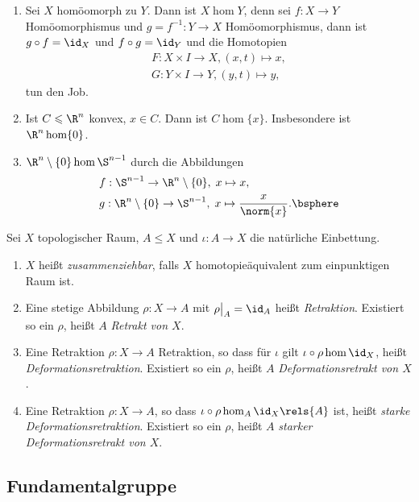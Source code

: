 \begin{bsp}
\label{bsp:3.1.9}
\begin{enumerate}
  \item Sei $X$ homöomorph zu $Y$. Dann ist $X\hom Y$, denn sei $f: X\to Y$
  Homöomorphismus und $g=f^{-1} : Y\to X$ Homöomorphismus, dann ist $g\circ f =
  \id_X$ und $f\circ g = \id_Y$ und die Homotopien
  \begin{align*}
  F: X\times I \to X, (x,t)\mapsto x,\\
  G: Y\times I\to Y, (y,t)\mapsto y,
  \end{align*}
tun den Job.
\item Ist $C\leqslant \R^n$ konvex, $x\in C$. Dann ist $C\hom\{x\}$.
Insbesondere ist $\R^n\hom \{0\}$.
\item $\R^n\setminus\{0\}\hom \S^{n-1}$ durch die Abbildungen
\begin{align*}
&f: \S^{n-1}\to \R^n\setminus\{0\},\; x\mapsto x,\\
&g: \R^n\setminus\{0\} \to \S^{n-1},\; x\mapsto \frac{x}{\norm{x}}.\bsphere
\end{align*}
\end{enumerate}
\end{bsp}

\begin{defn}
\label{defn:3.1.10}
Sei $X$ topologischer Raum, $A\leqslant X$ und $\iota: A\to X$ die natürliche
Einbettung.
\begin{enumerate}[label=(\roman{*})]
  \item $X$ heißt \emph{zusammenziehbar}, falls $X$ homotopieäquivalent zum
  einpunktigen Raum ist.
  \item Eine stetige Abbildung $\rho: X\to A$ mit $\rho\big|_{A} = \id_A$ heißt
  \emph{Retraktion}. Existiert so ein $\rho$, heißt $A$
  \emph{Retrakt von $X$}.
  \item Eine Retraktion $\rho: X\to A$ Retraktion, so dass für 
  $\iota$ gilt $\iota\circ\rho \hom \id_X$, heißt 
  \emph{Deformationsretraktion}. Existiert so ein $\rho$, heißt $A$
  \emph{Deformationsretrakt von $X$}.
  \item Eine Retraktion $\rho: X\to A$, so dass $\iota\circ \rho
  \hom_A \id_X \rels{A}$ ist,  heißt \emph{starke
  Deformationsretraktion}. Existiert so ein $\rho$, heißt $A$ \emph{starker
  Deformationsretrakt von $X$}.\fishhere
\end{enumerate}
\end{defn}

\subsection{Fundamentalgruppe}

